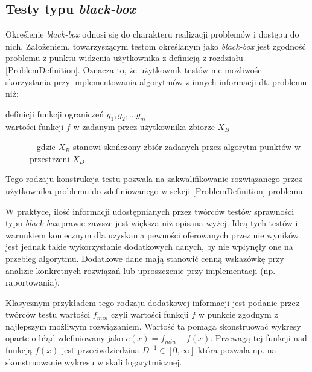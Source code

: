 \documentclass[12pt,a4paper]{report}
\begin{document}
{{{{{\subsection{Testy typu \emph{black-box}}
\par{
Określenie \emph{black-box} odnosi się do charakteru realizacji problemów i dostępu do nich. Założeniem, towarzyszącym testom określanym jako \emph{black-box} jest zgodność problemu z punktu widzenia użytkownika z definicją z rozdziału \ref{ProblemDefinition}. Oznacza to, że użytkownik testów nie możliwości skorzystania przy implementowania algorytmów z innych informacji dt. problemu niż:
\begin{description}
\item[definicji funkcji ograniczeń $g_1, g_2, \ldots g_m$]
\item[wartości funkcji $f$ w zadanym przez użytkownika zbiorze $X_B$] -- gdzie $X_B$ stanowi skończony zbiór zadanych przez algorytm punktów w przestrzeni $X_D$.
\end{description}
Tego rodzaju konstrukcja testu pozwala na zakwalifikowanie rozwiązanego przez użytkownika problemu do zdefiniowanego w sekcji \ref{ProblemDefinition} problemu.
}
\par{
W praktyce, ilość informacji udostępnianych przez twórców testów sprawności typu \emph{black-box} prawie zawsze jest większa niż opisana wyżej. Ideą tych testów i warunkiem koniecznym dla uzyskania pewności oferowanych przez nie wyników jest jednak takie wykorzystanie dodatkowych danych, by nie wpłynęły one na przebieg algorytmu. Dodatkowe dane mają stanowić cenną wskazówkę przy analizie konkretnych rozwiązań lub uproszczenie przy implementacji (np. raportowania).
\par{
Klasycznym przykładem tego rodzaju dodatkowej informacji jest podanie przez twórców testu wartości $f_{min}$ czyli wartości funkcji $f$ w punkcie zgodnym z najlepszym możliwym rozwiązaniem. Wartość ta pomaga skonstruować wykresy oparte o błąd zdefiniowany jako $e(x) = f_{min} - f(x)$. Przewagą tej funkcji nad funkcją $f(x)$ jest przeciwdziedzina $D^{-1} \in [0, \infty]$ która pozwala np. na skonstruowanie wykresu w skali logarytmicznej.
}

}}}}}}
\end{document}
